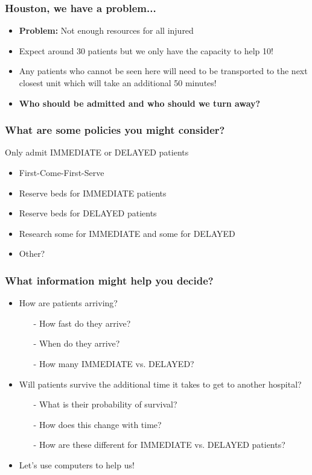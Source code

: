 \documentclass{beamer}
\begin{document}
\begin{frame}
  \frametitle{Houston, we have a problem...}
  \begin{itemize}
    \item \textbf{Problem:} Not enough resources for all injured
    \item Expect around 30 patients but we only have the capacity to help 10!\pause
    \item Any patients who cannot be seen here will need to be transported to the next closest unit which will take an additional 50 minutes!\pause
    \item \textbf{Who should be admitted and who should we turn away?}
  \end{itemize}
\end{frame}

\begin{frame}
  \frametitle{What are some policies you might consider?}
  \pause
  Only admit IMMEDIATE or DELAYED patients
  \pause
  \begin{itemize}
    \item First-Come-First-Serve
    \item Reserve beds for IMMEDIATE patients
    \item Reserve beds for DELAYED patients
    \item Research some for IMMEDIATE and some for DELAYED
    \item Other?
  \end{itemize}
\end{frame}

\begin{frame}
  \frametitle{What information might help you decide?}
  \pause
  \begin{itemize}
    \item How are patients arriving?
    \begin{itemize}
      \item[-] How fast do they arrive?
      \item[-] When do they arrive?
      \item[-] How many IMMEDIATE vs. DELAYED?
    \end{itemize}
  \end{itemize}
  \pause
  \begin{itemize}
    \item Will patients survive the additional time it takes to get to another hospital?
    \begin{itemize}
      \item[-] What is their probability of survival?
      \item[-] How does this change with time?
      \item[-] How are these different for IMMEDIATE vs. DELAYED patients?
    \end{itemize}
    \pause
    \item Let's use computers to help us!
  \end{itemize}
\end{frame}
\end{document}
